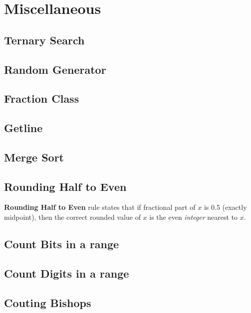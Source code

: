 \chapter{Miscellaneous}

\section{Ternary Search}


\section{Random Generator}


\section{Fraction Class}


\section{Getline}


\section{Merge Sort}


\section{Rounding Half to Even}

    \textbf{Rounding Half to Even} rule states that 
    if fractional part of $x$ is 0.5 (exactly midpoint), then the correct rounded value of $x$ is the even \textit{integer} nearest to $x$.


\section{Count Bits in a range}


\section{Count Digits in a range}


\section{Couting Bishops}

